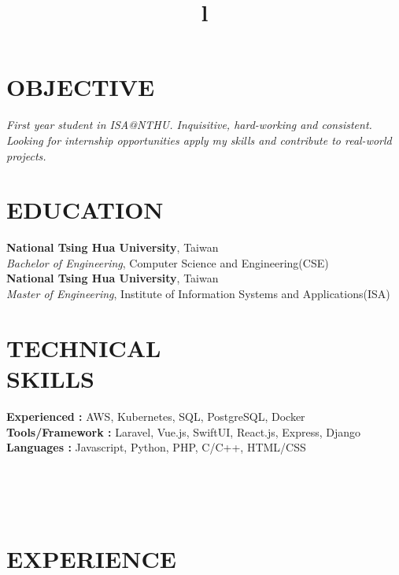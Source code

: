 \documentclass[margin]{res}
\begin{document}
\begin{resume}
\section{OBJECTIVE}
{\sl First year student in ISA@NTHU. Inquisitive, hard-working and consistent. Looking for internship opportunities apply my skills and contribute to real-world projects. }

\section{EDUCATION}
\textbf{National Tsing Hua University}, Taiwan\\
{\sl Bachelor of Engineering}, Computer Science and Engineering(CSE)\\
\textbf{National Tsing Hua University}, Taiwan \\
{\sl Master of Engineering}, Institute of Information Systems and Applications(ISA) 
\section{TECHNICAL\\SKILLS}

\textbf{Experienced : } AWS, Kubernetes, SQL, PostgreSQL, Docker
\\
\textbf{Tools/Framework : } Laravel, Vue.js, SwiftUI, React.js, Express, Django
\\
\textbf{Languages : } Javascript, Python, PHP, C/C++, HTML/CSS

\begin{format}
\title{l}\\
\\
\body\\
\end{format}

\section{EXPERIENCE}


\end{resume}
\end{document}
